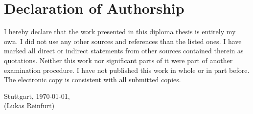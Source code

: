 \chapter*{Declaration of Authorship}

\noindent
I hereby declare that the work presented in this diploma thesis is entirely my own.
I did not use any other sources and references than the listed ones.
I have marked all direct or indirect statements from other sources contained therein as quotations.
Neither this work nor significant parts of it were part of another examination procedure.
I have not published this work in whole or in part before.
The electronic copy is consistent with all submitted copies.

\vspace{4em}

\noindent
Stuttgart, \today,\hspace{4em}\hdashrule[0.5ex][x]{8.5cm}{1pt}{1pt}\\
\phantom{Stuttgart, \today,}\hspace{4em}(Lukas Reinfurt)
